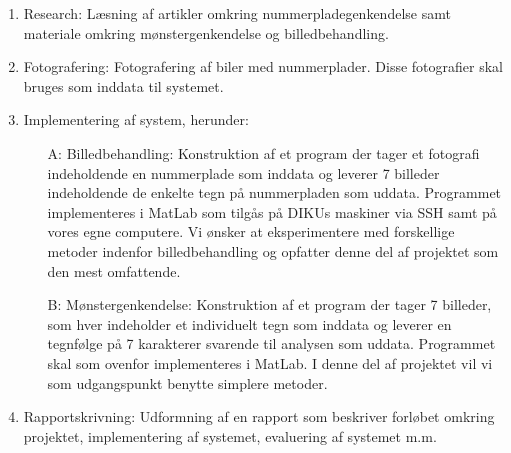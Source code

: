 \begin{enumerate}
\item Research: Læsning af artikler omkring nummerpladegenkendelse samt materiale omkring mønstergenkendelse og billedbehandling. %

\item Fotografering: Fotografering af biler med nummerplader. Disse fotografier skal bruges som inddata til systemet.%


\item Implementering af system, herunder:

\begin{itemize}
\item[A:] Billedbehandling: Konstruktion af et program der tager et fotografi indeholdende en nummerplade som inddata og leverer 7 billeder indeholdende de enkelte tegn på nummerpladen som uddata. Programmet implementeres i MatLab som tilgås på DIKUs maskiner via SSH samt på vores egne computere. Vi ønsker at eksperimentere med forskellige metoder indenfor billedbehandling og opfatter denne del af projektet som den mest omfattende.%

\item[B:] Mønstergenkendelse: Konstruktion af et program der tager 7 billeder, som hver indeholder et individuelt tegn som inddata og leverer en tegnfølge på 7 karakterer svarende til analysen som uddata. Programmet skal som ovenfor implementeres i MatLab. I denne del af projektet vil vi som udgangspunkt benytte simplere metoder.%

\end{itemize}





\item Rapportskrivning: Udformning af en rapport som beskriver forløbet omkring projektet, implementering af systemet, evaluering af systemet m.m. %


\end{enumerate}
